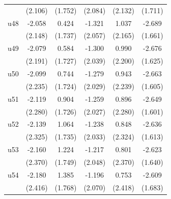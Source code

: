 \begin{table}[htbp]
\begin{tabular}{l*{5}{c}}
                    &     (2.106)         &     (1.752)         &     (2.084)         &     (2.132)         &     (1.711)         \\
\addlinespace
u48                 &      -2.058         &       0.424         &      -1.321         &       1.037         &      -2.689         \\
                    &     (2.148)         &     (1.737)         &     (2.057)         &     (2.165)         &     (1.661)         \\
\addlinespace
u49                 &      -2.079         &       0.584         &      -1.300         &       0.990         &      -2.676\sym{*}  \\
                    &     (2.191)         &     (1.727)         &     (2.039)         &     (2.200)         &     (1.625)         \\
\addlinespace
u50                 &      -2.099         &       0.744         &      -1.279         &       0.943         &      -2.663\sym{*}  \\
                    &     (2.235)         &     (1.724)         &     (2.029)         &     (2.239)         &     (1.605)         \\
\addlinespace
u51                 &      -2.119         &       0.904         &      -1.259         &       0.896         &      -2.649\sym{*}  \\
                    &     (2.280)         &     (1.726)         &     (2.027)         &     (2.280)         &     (1.601)         \\
\addlinespace
u52                 &      -2.139         &       1.064         &      -1.238         &       0.848         &      -2.636         \\
                    &     (2.325)         &     (1.735)         &     (2.033)         &     (2.324)         &     (1.613)         \\
\addlinespace
u53                 &      -2.160         &       1.224         &      -1.217         &       0.801         &      -2.623         \\
                    &     (2.370)         &     (1.749)         &     (2.048)         &     (2.370)         &     (1.640)         \\
\addlinespace
u54                 &      -2.180         &       1.385         &      -1.196         &       0.753         &      -2.609         \\
                    &     (2.416)         &     (1.768)         &     (2.070)         &     (2.418)         &     (1.683)         \\

\end{tabular}
\end{table}

